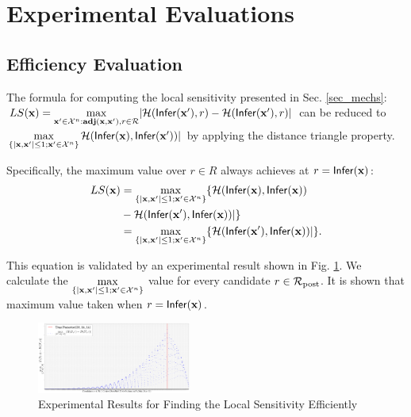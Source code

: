 \documentclass{article}
\begin{document}
\section{Experimental Evaluations}
\label{sec_experiment}

\subsection{Efficiency Evaluation}
\label{subsec_effi}
The formula for computing the local sensitivity presented in Sec. \ref{sec_mechs}: $LS(\textbf{x})=\max\limits_{\textbf{x}' \in \mathcal{X}^n:\textbf{adj}(\textbf{x},\textbf{x}'), r\in \mathcal{R}}\lvert \mathcal{H}(\mathsf{Infer}(\textbf{x}'), r) - \mathcal{H}(\mathsf{Infer}(\textbf{x}'), r)\rvert$ 
can be reduced to $\max\limits_{\{|\textbf{x},\textbf{x}'| \leq 1; \textbf{x}'\in \mathcal{X}^n\}}\mathcal{H}(\mathsf{Infer}(\textbf{x}), \mathsf{Infer}(\textbf{x}'))|$
by applying the distance triangle property. 

Specifically, the maximum value over ${r \in R}$ always achieves at $r = \mathsf{Infer}(\textbf{x})$:
\begin{equation*}
\begin{split}
LS(\textbf{x}) 
  & = \max\limits_{\{|\textbf{x},\textbf{x}'| \leq 1;\textbf{x}'\in \mathcal{X}^n\}} \{\mathcal{H}(\mathsf{Infer}(\textbf{x}), \mathsf{Infer}(\textbf{x})) \\
  & - \mathcal{H}(\mathsf{Infer}(\textbf{x}'), \mathsf{Infer}(\textbf{x}))|\} \\
  & = \max\limits_{\{|\textbf{x},\textbf{x}'| \leq 1;\textbf{x}'\in \mathcal{X}^n\}} \{\mathcal{H}(\mathsf{Infer}(\textbf{x}'), \mathsf{Infer}(\textbf{x}))|\}.
\end{split}
\end{equation*}

This equation is validated by an experimental result shown in Fig. \ref{fig_efficiency}. We calculate the $\max\limits_{\{|\textbf{x},\textbf{x}'| \leq 1;\textbf{x}'\in \mathcal{X}^n\}}$ value for every candidate $r \in \mathcal{R}_{\textup{post}}$. It is shown that maximum value taken when  $r = \mathsf{Infer}(\textbf{x})$.

\begin{figure}[ht]
\centering
\includegraphics[width=0.45\textwidth]{efficiency.eps}
\caption{Experimental Results for Finding the Local Sensitivity Efficiently}
\label{fig_efficiency}
\end{figure}
\end{document}
